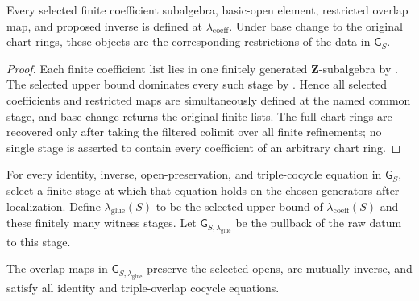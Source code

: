 \begin{lemma}
  \label{lemma:nagata-affine-gluing-coefficients-descend}

  Every selected finite coefficient subalgebra, basic-open element, restricted
  overlap map, and proposed inverse is defined at
  $\lambda_{\mathrm{coeff}}$.  Under base change to the original chart rings,
  these objects are the corresponding restrictions of the data in
  $\mathsf G_S$.
\end{lemma}

\begin{proof}
  Each finite coefficient list lies in one finitely generated
  $\mathbf Z$-subalgebra by
  .  The selected upper bound
  dominates every such stage by
  .  Hence all selected
  coefficients and restricted maps are simultaneously defined at the named
  common stage, and base change returns the original finite lists.  The full
  chart rings are recovered only after taking the filtered colimit over all
  finite refinements; no single stage is asserted to contain every coefficient
  of an arbitrary chart ring.
\end{proof}

\begin{definition}
  \label{def:nagata-affine-gluing-valid-stage}

  For every identity, inverse, open-preservation, and triple-cocycle equation
  in $\mathsf G_S$, select a finite stage at which that equation holds on the
  chosen generators after localization.  Define
  $\lambda_{\mathrm{glue}}(S)$ to be the selected upper bound of
  $\lambda_{\mathrm{coeff}}(S)$ and these finitely many witness stages.  Let
  $\mathsf G_{S,\lambda_{\mathrm{glue}}}$ be the pullback of the raw datum to
  this stage.
\end{definition}

\begin{lemma}
  \label{lemma:nagata-affine-gluing-identities-eventually}

  The overlap maps in $\mathsf G_{S,\lambda_{\mathrm{glue}}}$ preserve the
  selected opens, are mutually inverse, and satisfy all identity and
  triple-overlap cocycle equations.
\end{lemma}

